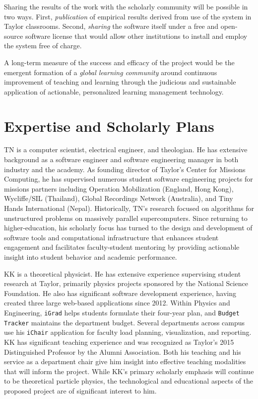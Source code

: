 \documentclass{article}
\begin{document}
Sharing the results of the work with the scholarly community
will be possible in two ways.
First, \emph{publication} of empirical results
derived from use of the system in Taylor classrooms.
Second, \emph{sharing} the software itself
under a free and open-source software license that would
allow other institutions to install and employ the
system free of charge.

A long-term measure of the success and efficacy of the project
would be the emergent formation of
a \emph{global learning community} around
continuous improvement of
teaching and learning
through the judicious and sustainable application
of actionable, personalized learning management technology.

\section{Expertise and Scholarly Plans}
\label{sec:expertise-plans}


TN is a computer scientist, electrical engineer, and theologian.
He has extensive background as a software engineer
and software engineering manager
in both industry and the academy.
As founding director of Taylor's Center for Missions Computing,
he has supervised numerous student software engineering projects
for missions partners including
Operation Mobilization (England, Hong Kong),
Wycliffe/SIL (Thailand),
Global Recordings Network (Australia),
and Tiny Hands International (Nepal).
Historically, TN's research focused on
algorithms for unstructured problems on
massively parallel supercomputers.
Since returning to higher-education,
his scholarly focus has turned
to the design and development
of software tools and computational infrastructure
that enhances student engagement
and facilitates faculty-student mentoring
by providing actionable insight
into student behavior and academic performance.

\newcommand{\igrad}{\texttt{iGrad}}
\newcommand{\ichair}{\texttt{iChair}}
\newcommand{\btracker}{\texttt{Budget Tracker}}

KK is a theoretical physicist.
He has extensive experience
supervising student research at Taylor,
primarily physics projects sponsored by the National Science Foundation.
He also has significant software development experience,
having created three large web-based applications since 2012.
Within Physics and Engineering,
\igrad{} helps students formulate their four-year plan,
and \btracker{} maintains the department budget.
Several departments across campus use his
\ichair{} application
for faculty load planning, visualization, and reporting.
KK has significant teaching experience
and was recognized as
Taylor's 2015 Distinguished Professor
by the Alumni Association.
Both his teaching and his service as a department chair
give him insight into effective teaching modalities
that will inform the project.
While KK's primary scholarly emphasis will continue to be
theoretical particle physics,
the technological and educational aspects of the proposed project
are of significant interest to him.
\end{document}

